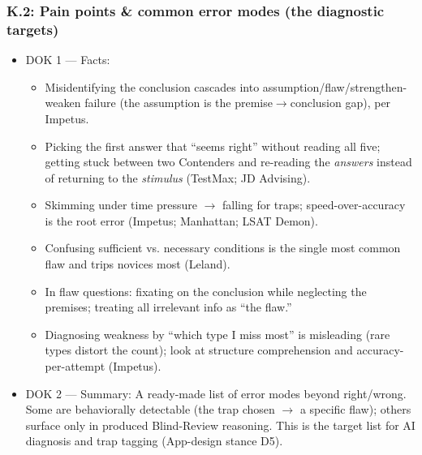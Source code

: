 \documentclass[11pt]{article}
\begin{document}
\subsubsection*{K.2: Pain points \& common error modes (the diagnostic targets)}
\begin{itemize}
\item DOK 1 --- Facts:
\begin{itemize}
\item Misidentifying the conclusion cascades into assumption/flaw/strengthen-weaken failure (the assumption is the premise$\rightarrow$conclusion gap), per Impetus.
\item Picking the first answer that \enquote{seems right} without reading all five; getting stuck between two Contenders and re-reading the \textit{answers} instead of returning to the \textit{stimulus} (TestMax; JD Advising).
\item Skimming under time pressure $\rightarrow$ falling for traps; speed-over-accuracy is the root error (Impetus; Manhattan; LSAT Demon).
\item Confusing sufficient vs. necessary conditions is the single most common flaw and trips novices most (Leland).
\item In flaw questions: fixating on the conclusion while neglecting the premises; treating all irrelevant info as \enquote{the flaw.}
\item Diagnosing weakness by \enquote{which type I miss most} is misleading (rare types distort the count); look at structure comprehension and accuracy-per-attempt (Impetus).
\end{itemize}
\item DOK 2 --- Summary: A ready-made list of error modes beyond right/wrong. Some are behaviorally detectable (the trap chosen $\rightarrow$ a specific flaw); others surface only in produced Blind-Review reasoning. This is the target list for AI diagnosis and trap tagging (App-design stance D5).
\end{itemize}
\end{document}

